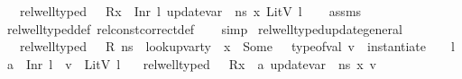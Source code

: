 \begin{isabellebody}
\ \ \ {\isachardoublequoteopen}rel{\isacharunderscore}{\kern0pt}well{\isacharunderscore}{\kern0pt}typed\ {\isasymLambda}\ {\isasymOmega}\ {\isacharparenleft}{\kern0pt}R{\isacharparenleft}{\kern0pt}x\ {\isasymmapsto}\ Inr\ l{\isacharparenright}{\kern0pt}{\isacharparenright}{\kern0pt}\ {\isacharparenleft}{\kern0pt}update{\isacharunderscore}{\kern0pt}var\ {\isasymLambda}\ ns\ x\ {\isacharparenleft}{\kern0pt}LitV\ l{\isacharparenright}{\kern0pt}{\isacharparenright}{\kern0pt}{\isachardoublequoteclose}\isanewline
%
\isadelimproof
\ \ %
\endisadelimproof
%
\isatagproof
{}\isamarkupfalse%
\ assms\isanewline
\ \ \isamarkupfalse%
\ rel{\isacharunderscore}{\kern0pt}well{\isacharunderscore}{\kern0pt}typed{\isacharunderscore}{\kern0pt}def\ rel{\isacharunderscore}{\kern0pt}const{\isacharunderscore}{\kern0pt}correct{\isacharunderscore}{\kern0pt}def\isanewline
\ \ \isamarkupfalse%
\ simp%
\endisatagproof
{\isafoldproof}%
%
\isadelimproof
\isanewline
%
\endisadelimproof
\isanewline
{}\isamarkupfalse%
\ rel{\isacharunderscore}{\kern0pt}well{\isacharunderscore}{\kern0pt}typed{\isacharunderscore}{\kern0pt}update{\isacharunderscore}{\kern0pt}general{\isacharcolon}{\kern0pt}\ \isanewline
\ \ \ {\isachardoublequoteopen}rel{\isacharunderscore}{\kern0pt}well{\isacharunderscore}{\kern0pt}typed\ {\isasymLambda}\ {\isasymOmega}\ R\ ns{\isachardoublequoteclose}\ \ {\isachardoublequoteopen}lookup{\isacharunderscore}{\kern0pt}var{\isacharunderscore}{\kern0pt}ty\ {\isasymLambda}\ x\ {\isacharequal}{\kern0pt}\ Some\ {\isasymtau}{\isachardoublequoteclose}\ \ {\isachardoublequoteopen}type{\isacharunderscore}{\kern0pt}of{\isacharunderscore}{\kern0pt}val\ v\ {\isacharequal}{\kern0pt}\ instantiate\ {\isasymOmega}\ {\isasymtau}{\isachardoublequoteclose}\ \ {\isachardoublequoteopen}{\isasymAnd}l{\isachardot}{\kern0pt}\ a\ {\isacharequal}{\kern0pt}\ Inr\ l\ {\isasymLongrightarrow}\ v\ {\isacharequal}{\kern0pt}\ LitV\ l{\isachardoublequoteclose}\isanewline
\ \ \ {\isachardoublequoteopen}rel{\isacharunderscore}{\kern0pt}well{\isacharunderscore}{\kern0pt}typed\ {\isasymLambda}\ {\isasymOmega}\ {\isacharparenleft}{\kern0pt}R{\isacharparenleft}{\kern0pt}x\ {\isasymmapsto}\ a{\isacharparenright}{\kern0pt}{\isacharparenright}{\kern0pt}\ {\isacharparenleft}{\kern0pt}update{\isacharunderscore}{\kern0pt}var\ {\isasymLambda}\ ns\ x\ v{\isacharparenright}{\kern0pt}{\isachardoublequoteclose}\isanewline
%
\isadelimproof

\end{isabellebody}
